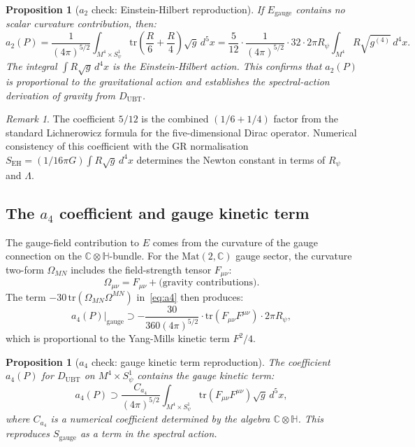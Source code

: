\documentclass[12pt,a4paper]{article}
\newtheorem{proposition}[theorem]{Proposition}
\theoremstyle{definition}
\theoremstyle{remark}
\newtheorem{remark}[theorem]{Remark}
\begin{document}
\begin{proposition}[$a_2$ check: Einstein-Hilbert reproduction]
\label{prop:a2_EH}
If $E_{\mathrm{gauge}}$ contains no scalar curvature contribution, then:
\begin{equation}
  a_2(P) = \frac{1}{(4\pi)^{5/2}} \int_{M^4\times S^1_\psi}
  \mathrm{tr}\!\left(\frac{R}{6} + \frac{R}{4}\right)\sqrt{g}\,d^5x
  = \frac{5}{12}\cdot\frac{1}{(4\pi)^{5/2}}
    \cdot 32\cdot 2\pi R_\psi \int_{M^4} R\sqrt{g^{(4)}}\,d^4x.
  \label{eq:a2_EH}
\end{equation}
The integral $\int R\sqrt{g}\,d^4x$ is the Einstein-Hilbert action.
This confirms that $a_2(P)$ is proportional to the gravitational action
and establishes the spectral-action derivation of gravity from
$D_{\mathrm{UBT}}$.
\end{proposition}

\begin{remark}
The coefficient $5/12$ is the combined $(1/6 + 1/4)$ factor from the standard
Lichnerowicz formula for the five-dimensional Dirac operator.
Numerical consistency of this coefficient with the GR normalisation
$S_{\mathrm{EH}} = (1/16\pi G)\int R\sqrt{g}\,d^4x$ determines the Newton constant
in terms of $R_\psi$ and $\Lambda$.
\end{remark}

\subsection{The $a_4$ coefficient and gauge kinetic term}

The gauge-field contribution to $E$ comes from the curvature of the gauge
connection on the $\mathbb{C}\otimes\mathbb{H}$-bundle.
For the $\mathrm{Mat}(2,\mathbb{C})$ gauge sector, the curvature two-form
$\Omega_{MN}$ includes the field-strength tensor $F_{\mu\nu}$:
\begin{equation}
  \Omega_{\mu\nu} = F_{\mu\nu} + \text{(gravity contributions)}.
  \label{eq:Omega_F}
\end{equation}
The term $-30\,\mathrm{tr}(\Omega_{MN}\Omega^{MN})$ in~\eqref{eq:a4} then
produces:
\begin{equation}
  a_4(P)\big|_{\mathrm{gauge}} \supset
  -\frac{30}{360(4\pi)^{5/2}} \cdot \mathrm{tr}(F_{\mu\nu}F^{\mu\nu})
  \cdot 2\pi R_\psi,
  \label{eq:a4_gauge}
\end{equation}
which is proportional to the Yang-Mills kinetic term $F^2/4$.

\begin{proposition}[$a_4$ check: gauge kinetic term reproduction]
\label{prop:a4_F2}
The coefficient $a_4(P)$ for $D_{\mathrm{UBT}}$ on $M^4\times S^1_\psi$
contains the gauge kinetic term:
\begin{equation}
  a_4(P) \supset
  \frac{C_{a_4}}{(4\pi)^{5/2}}
  \int_{M^4\times S^1_\psi}
  \mathrm{tr}(F_{\mu\nu}F^{\mu\nu})\sqrt{g}\,d^5x,
\end{equation}
where $C_{a_4}$ is a numerical coefficient determined by the algebra
$\mathbb{C}\otimes\mathbb{H}$.
This reproduces $S_{\mathrm{gauge}}$ as a term in the spectral action.
\end{proposition}
\end{document}
